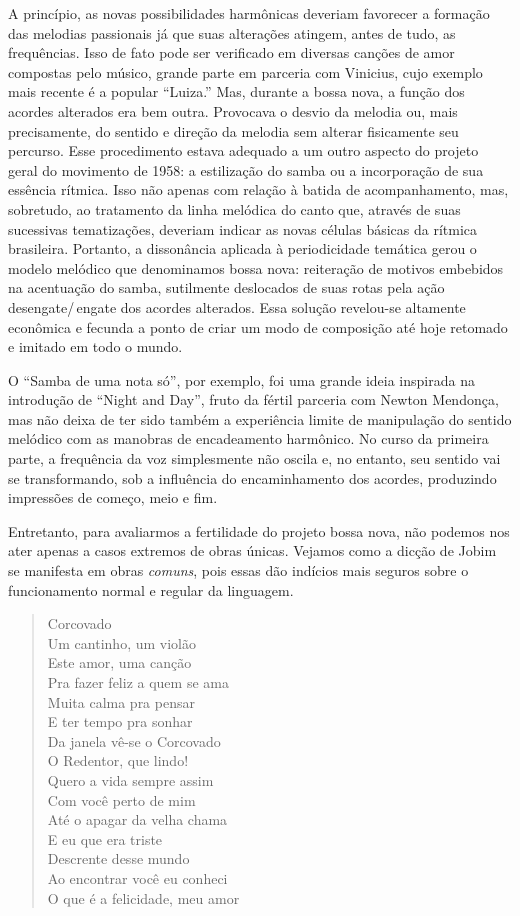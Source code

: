 A princípio, as novas possibilidades harmônicas deveriam favorecer a
formação das melodias passionais já que suas alterações atingem, antes
de tudo, as frequências. Isso de fato pode ser verificado em diversas
canções de amor compostas pelo músico, grande parte em parceria com
Vinicius, cujo exemplo mais recente é a popular ``Luiza.'' Mas, durante a bossa nova, a função dos acordes alterados era
bem outra. Provocava o desvio da melodia ou, mais precisamente, do
sentido e direção da melodia sem alterar fisicamente seu percurso.
Esse procedimento estava adequado a um outro aspecto do projeto geral do
movimento de 1958: a estilização do samba ou a incorporação de sua
essência rítmica. Isso não apenas com relação à batida de
acompanhamento, mas, sobretudo, ao tratamento da linha melódica do canto
que, através de suas sucessivas tematizações, deveriam indicar as novas
células básicas da rítmica brasileira. Portanto, a dissonância aplicada
à periodicidade temática gerou o modelo melódico que denominamos bossa
nova: reiteração de motivos embebidos na acentuação do samba, sutilmente
deslocados de suas rotas pela ação desengate/\,engate dos acordes
alterados. Essa solução revelou-se altamente econômica e fecunda a ponto
de criar um modo de composição até hoje retomado e imitado em todo o
mundo.

O ``Samba de uma nota só'', por exemplo, foi uma grande ideia inspirada na
introdução de ``Night and Day'', fruto da fértil parceria com Newton
Mendonça, mas não deixa de ter sido também a experiência limite de
manipulação do sentido melódico com as manobras de encadeamento
harmônico. No curso da primeira parte, a frequência da voz simplesmente
não oscila e, no entanto, seu sentido vai se transformando, sob a
influência do encaminhamento dos acordes, produzindo impressões de
começo, meio e fim.

Entretanto, para avaliarmos a fertilidade do projeto bossa nova, não
podemos nos ater apenas a casos extremos de obras únicas. Vejamos como a
dicção de Jobim se manifesta em obras \textit{comuns}, pois essas dão
indícios mais seguros sobre o funcionamento normal e regular da
linguagem.

\begin{verse}
\small{Corcovado\\
Um cantinho, um violão\\
Este amor, uma canção\\
Pra fazer feliz a quem se ama\\
Muita calma pra pensar\\
E ter tempo pra sonhar\\
Da janela vê-se o Corcovado\\
O Redentor, que lindo!\\
Quero a vida sempre assim\\
Com você perto de mim\\
Até o apagar da velha chama\\
E eu que era triste\\
Descrente desse mundo\\
Ao encontrar você eu conheci\\
O que é a felicidade, meu amor}
\end{verse}

